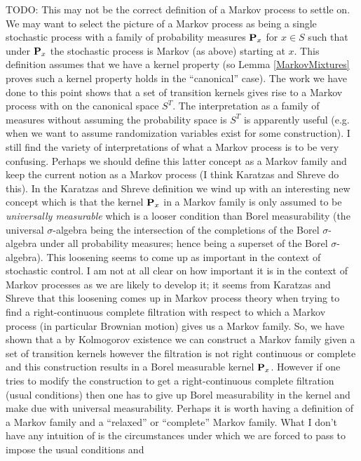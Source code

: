 TODO:  This may not be the correct definition of a Markov process to
settle on.   We may want to select the picture of a Markov process as
being a single stochastic process with a family of probability
measures $\textbf{P}_x$ for $x \in S$ such that under $\textbf{P}_x$ the
stochastic process is Markov (as above) starting at $x$.  This
definition assumes that we have a kernel property (so Lemma
\ref{MarkovMixtures} proves such a kernel property
holds in the ``canonical'' case).  The work we have done to this point
shows that a set of transition kernels gives rise to a Markov process
with on the canonical space $S^T$.  The interpretation as a family of measures
without assuming the probability space is $S^T$ is apparently useful (e.g. when we want to
assume randomization variables exist for some construction).  I still find the variety of
interpretations of what a Markov process is to be very confusing.
Perhaps we should define this latter concept as a Markov family and
keep the current notion as a Markov process (I think Karatzas and
Shreve do this).  In the Karatzas and Shreve definition we wind up
with an interesting new concept which is that the kernel
$\textbf{P}_x$ in a Markov family is only assumed to be \emph{universally measurable}
which is a looser condition than Borel measurability (the universal
$\sigma$-algebra being the intersection of the completions of the
Borel $\sigma$-algebra under all probability measures; hence being a
superset of the Borel $\sigma$-algebra).  This loosening
seems to come up as important in the context of stochastic control.  I
am not at all clear on how important it is in the context of Markov
processes as we are likely to develop it; it seems from Karatzas and
Shreve that this loosening comes up in Markov process theory when
trying to find a right-continuous complete filtration with respect to which a
Markov process (in particular Brownian motion) gives us a Markov
family.  So, we have shown that a by Kolmogorov existence we can
construct a Markov family given a set of transition kernels however
the filtration is not right continuous or complete and this
construction results in a Borel measurable kernel $\textbf{P}_x$.
However if one tries to modify the construction to get a
right-continuous complete filtration (usual conditions) then one has
to give up Borel measurability in the kernel and make due with
universal measurability.  Perhaps it is worth having a definition of a Markov family 
and a ``relaxed'' or ``complete'' Markov family.  What I don't have any intuition of 
is the circumstances under which we are forced to pass to impose the usual conditions and
